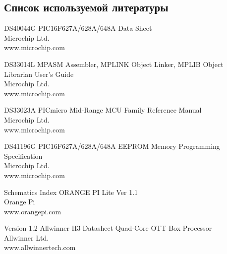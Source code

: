 \subsection{ Список используемой литературы}
\begin{my_enumerate}
\item
DS40044G PIC16F627A/628A/648A Data Sheet \\
Microchip Ltd.\\
www.microchip.com\\

\item
DS33014L MPASM Assembler, MPLINK Object Linker, MPLIB Object Librarian User’s Guide \\
Microchip Ltd.\\
www.microchip.com \\

\item
DS33023A PICmicro Mid-Range MCU Family Reference Manual \\
Microchip Ltd. \\
www.microchip.com \\

\item
DS41196G PIC16F627A/628A/648A EEPROM Memory Programming Specification \\
Microchip Ltd. \\
www.microchip.com \\

\item
Schematics Index ORANGE PI Lite Ver 1.1 \\
Orange Pi \\
www.orangepi.com \\

\item
Version 1.2 Allwinner H3 Datasheet Quad-Core OTT Box Processor \\
Allwinner Ltd. \\
www.allwinnertech.com \\

\end{my_enumerate}

